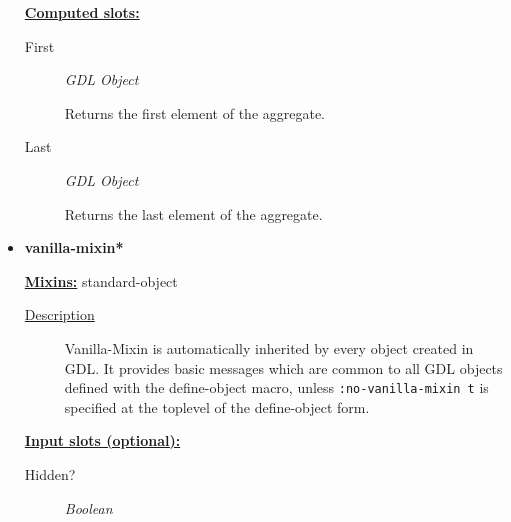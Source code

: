 \documentclass [11pt]{book}
\begin{document}
\begin{itemize}
\begin{description}
\end{description}








\textbf{
\underline{Computed slots:}}

\begin{description}

\item [First]
\emph{GDL Object}

 Returns the first element of the aggregate.




\item [Last]
\emph{GDL Object}

 Returns the last element of the aggregate.




\end{description}







\item {}
\label{prim:vanilla-mixin*}
\textbf{vanilla-mixin*}


\textbf{
\underline{Mixins:}} standard-object





\begin{description}

\item [
\underline{Description}]


Vanilla-Mixin is automatically
inherited by every object created in GDL. It provides basic messages
which are common to all GDL objects defined with the define-object
macro, unless \texttt{:no-vanilla-mixin t} is specified at the
toplevel of the define-object form.



\end{description}








\textbf{
\underline{Input slots (optional):}}

\begin{description}

\item [Hidden?]
\emph{Boolean}


\end{description}
\end{itemize}
\end{document}
